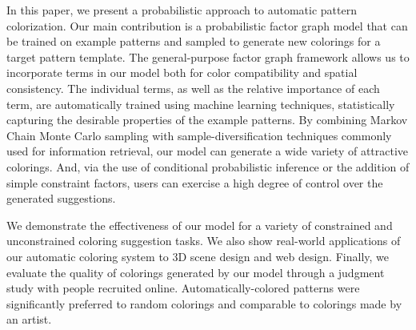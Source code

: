 In this paper, we present a probabilistic approach to automatic pattern colorization. Our main contribution is a probabilistic factor graph model that can be trained on example patterns and sampled to generate new colorings for a target pattern template. The general-purpose factor graph framework allows us to incorporate terms in our model both for color compatibility and spatial consistency. The individual terms, as well as the relative importance of each term, are automatically trained using machine learning techniques, statistically capturing the desirable properties of the example patterns. By combining Markov Chain Monte Carlo sampling with sample-diversification techniques commonly used for information retrieval, our model can generate a wide variety of attractive colorings. And, via the use of conditional probabilistic inference or the addition of simple constraint factors, users can exercise a high degree of control over the generated suggestions.

We demonstrate the effectiveness of our model for a variety of constrained and unconstrained coloring suggestion tasks. We also show real-world applications of our automatic coloring system to 3D scene design and web design. Finally, we evaluate the quality of colorings generated by our model through a judgment study with people recruited online. Automatically-colored patterns were significantly preferred to random colorings and comparable to colorings made by an artist.